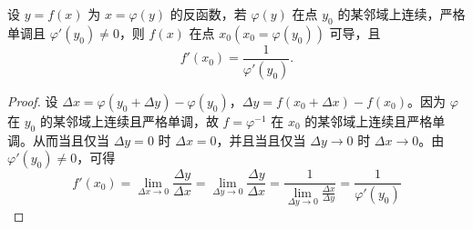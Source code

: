 \documentclass[../../main.tex]{subfiles}
\begin{document}
\begin{theorem}[反函数求导定理]\label{theorem:反函数求导定理}
设 \( y = f(x) \) 为 \( x = \varphi(y) \) 的反函数，若 \( \varphi(y) \) 在点 \( y_0 \) 的某邻域上连续，严格单调且 \( \varphi'(y_0) \neq 0 \)，则 \( f(x) \) 在点 \( x_0 (x_0 = \varphi(y_0)) \) 可导，且
\[
f'(x_0) = \frac{1}{\varphi'(y_0)}.
\]
\end{theorem}
\begin{proof}
设 \( \Delta x = \varphi(y_0 + \Delta y) - \varphi(y_0) \)，\( \Delta y = f(x_0 + \Delta x) - f(x_0) \)。因为 \( \varphi \) 在 \( y_0 \) 的某邻域上连续且严格单调，故 \( f = \varphi^{-1} \) 在 \( x_0 \) 的某邻域上连续且严格单调。从而当且仅当 \( \Delta y = 0 \) 时 \( \Delta x = 0 \)，并且当且仅当 \( \Delta y \to 0 \) 时 \( \Delta x \to 0 \)。由 \( \varphi'(y_0) \neq 0 \)，可得
\[
f'(x_0) = \lim_{\Delta x \to 0} \frac{\Delta y}{\Delta x} = \lim_{\Delta y \to 0} \frac{\Delta y}{\Delta x} = \frac{1}{\lim\limits_{\Delta y \to 0} \frac{\Delta x}{\Delta y}} = \frac{1}{\varphi'(y_0)}
\]

\end{proof}
\end{document}
